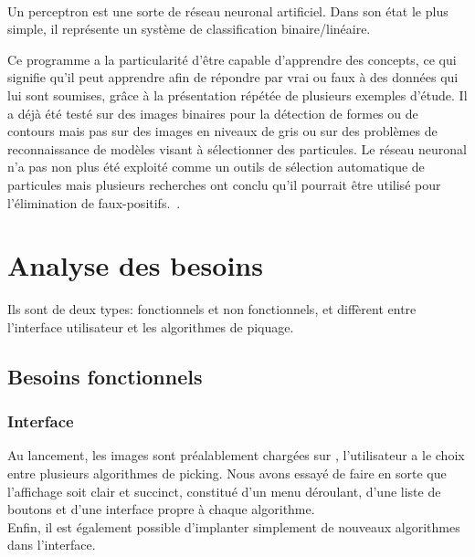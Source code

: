\documentclass[12pt,a4paper]{report}
\begin{document}
\paragraph*{}
Un perceptron est une sorte de réseau neuronal artificiel. Dans son état le plus simple, il représente un système de classification binaire/linéaire.%

\noindent
Ce programme a la particularité d'être capable d'apprendre des concepts, ce qui signifie qu'il peut apprendre afin de répondre par vrai ou faux à des données qui lui sont soumises, gr\^ace à la présentation répétée de plusieurs exemples d'étude.
Il a déjà été testé sur des images binaires pour la détection de formes ou de contours mais pas sur des images en niveaux de gris ou sur des problèmes de reconnaissance de modèles visant à sélectionner des particules. Le réseau neuronal n'a pas non plus été exploité comme un outils de sélection automatique de particules mais plusieurs recherches ont conclu qu'il pourrait \^etre utilisé pour l'élimination de faux-positifs.~\cite{Perceptron:article}.%

\section{Analyse des besoins}

\noindent
Ils sont de deux types: fonctionnels et non fonctionnels, et diffèrent entre l'interface utilisateur et les algorithmes de piquage.

\subsection{Besoins fonctionnels}

\subsubsection{Interface}

\noindent
Au lancement, les images sont préalablement chargées sur \imj , l'utilisateur a le choix entre plusieurs algorithmes de picking. %
Nous avons essayé de faire en sorte que l'affichage soit clair et succinct, constitué d'un menu déroulant, d'une liste de boutons et d'une interface propre à chaque algorithme.\\
Enfin, il est également possible d'implanter simplement de nouveaux algorithmes dans l'interface. %
\end{document}

